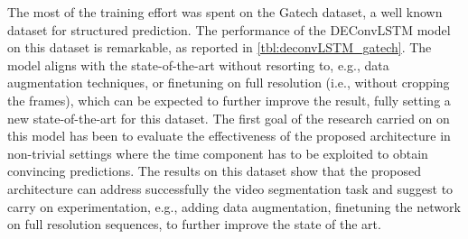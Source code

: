 


The most of the training effort was spent on the Gatech dataset, a well known
dataset for structured prediction. The performance of the DEConvLSTM model on
this dataset is remarkable, as reported in \autoref{tbl:deconvLSTM_gatech}. The
model aligns with the state-of-the-art without resorting to, e.g., data
augmentation techniques, or finetuning on full resolution (i.e., without
cropping the frames), which can be expected to further improve the result,
fully setting a new state-of-the-art for this dataset. The first goal of the
research carried on on this model has been to evaluate the effectiveness of the
proposed architecture in non-trivial settings where the time component has to
be exploited to obtain convincing predictions. The results on this dataset show
that the proposed architecture can address successfully the video segmentation
task and suggest to carry on experimentation, e.g., adding data augmentation,
finetuning the network on full resolution sequences, to further improve the
state of the art.

\begin{table}[t]
    \caption{Results on the Gatech dataset. Pixel accuracy is reported (higher
        is better). IoU is not reported as customary in the literature for this
        dataset.}
    \label{tbl:deconvLSTM_gatech}
\end{table}


